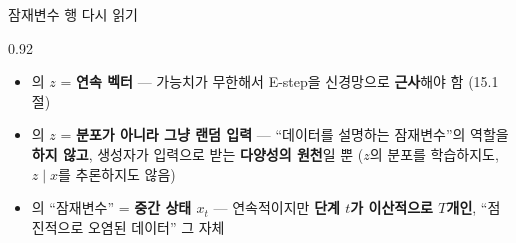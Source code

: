 \begin{frame}{잠재변수 행 다시 읽기}
\begin{center}\begin{varwidth}{0.92\textwidth}
  
  \begin{itemize}
    \item {}의 $z$ = \textbf{연속 벡터} — 가능치가 무한해서
      E-step을 신경망으로 \textbf{근사}해야 함 (15.1절)
    \item {}의 $z$ = \textbf{분포가 아니라 그냥 랜덤 입력} —
      ``데이터를 설명하는 잠재변수''의 역할을 \textbf{하지 않고},
      생성자가 입력으로 받는 \textbf{다양성의 원천}일 뿐
      ($z$의 분포를 학습하지도, $z \mid x$를 추론하지도 않음)
    \item {}의 ``잠재변수'' = \textbf{중간 상태 $x_t$}
      — 연속적이지만 \textbf{단계 $t$가 이산적으로 $T$개인},
      ``점진적으로 오염된 데이터'' 그 자체
  \end{itemize}
\end{varwidth}\end{center}
\end{frame}
